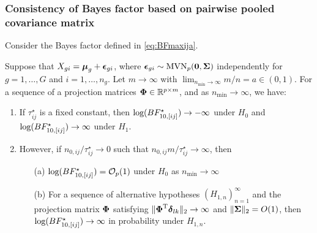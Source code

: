 \documentclass[APA,Times1COL]{WileyNJDv5} %
\def\bzero{{\mathbf 0}}
\def\log{\hbox{log}}
\def\MVN{\hbox{MVN}}
\def\log{\hbox{log}}
\def\trans{^{\rm T}}
\def\bzero{{\mathbf 0}}
\newcommand{\bSigma}{\mbox{\boldmath $\Sigma$}}
\newcommand{\udelta}            {\mbox{\boldmath$\delta$}}
\newcommand{\uepsilon}          {\mbox{\boldmath$\epsilon$}}
\newcommand{\umu}               {\mbox{\boldmath$\mu$}}
\newcommand{\uSigma}            {\mbox{\boldmath$\Sigma$}}
\newcommand{\uPhi}              {\mbox{\boldmath$\Phi$}}
\begin{document}
\subsubsection{Consistency of Bayes factor based on pairwise pooled covariance matrix}
Consider the Bayes factor defined in \eqref{eq:BFmaxija}. 
\begin{theorem}\label{Thrm2}
Suppose that $X_{gi} = \umu_g + \uepsilon_{gi}$, where $\uepsilon_{gi} \sim \MVN_{p}(\bzero, \uSigma)$ independently for $g = 1, \ldots, G$ and $i = 1,\ldots,n_g$. Let $m \rightarrow \infty$ with $ \lim_{n_{\min} \rightarrow \infty} m / n =  a \in  (0, 1)$. For a sequence of a projection matrices $\uPhi \in \mathbb{R}^{p \times m}$, and as $n_{\min} \rightarrow \infty$, we have:
\begin{enumerate}
    \item If $\tau^{\star}_{ij}$ is a fixed constant, 
    then $\log(BF^{\star}_{10, [ij]}) \rightarrow -\infty$ under $H_0$ and $\log(BF^{\star}_{10, [ij]}) \rightarrow \infty$ under $H_1$. 
    \item However, if $n_{0,ij}/\tau^{\star}_{ij} \rightarrow 0$ such that $n_{0,ij} m/\tau^{\star}_{ij} \rightarrow \infty$, then
    \begin{itemize}
     \item[(a)]  $\log(BF^{\star}_{10, [ij]}) = \mathcal{O}_{p}(1)$ under $H_0$ as $n_{\min} \rightarrow \infty$ 
     \item[(b)] 
     For a sequence of alternative hypotheses $(H_{1,n})_{n = 1}^\infty$ and the projection matrix $\uPhi$ satisfying $\|\uPhi\trans\udelta_{lk}\|_2\to\infty$ and $\|\bSigma\|_2 = O(1)$, then $\log(BF^{\star}_{10, [ij]}) \rightarrow \infty$ in probability under $H_{1,n}$. 
    \end{itemize}
\end{enumerate}
\end{theorem}
\end{document}
